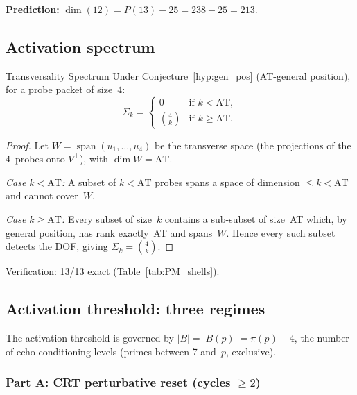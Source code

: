 \documentclass[12pt,a4paper]{article}
\begin{document}
\noindent
\textbf{Prediction:} $\dim(12) = P(13) - 25 = 238 - 25 = 213$.


\subsection{Activation spectrum}
\label{sec:PM_sigma}

\begin{thmbox}{Transversality Spectrum}
\label{thm:sigma}
Under Conjecture~\ref{hyp:gen_pos} (AT-general position), for a probe packet
of size~$4$:
\[
  \Sigma_k = \begin{cases}
    0 & \text{if } k < \mathrm{AT}, \\
    \displaystyle\binom{4}{k} & \text{if } k \ge \mathrm{AT}.
  \end{cases}
\]
\end{thmbox}

\begin{proof}
Let $W = \operatorname{span}(u_1, \ldots, u_4)$ be the transverse space (the
projections of the 4~probes onto $V^{\perp}$), with $\dim W = \mathrm{AT}$.

\emph{Case $k < \mathrm{AT}$:}  A subset of $k < \mathrm{AT}$ probes spans a
space of dimension $\le k < \mathrm{AT}$ and cannot cover~$W$.

\emph{Case $k \ge \mathrm{AT}$:}  Every subset of size~$k$ contains a
sub-subset of size~AT which, by general position, has rank exactly~AT and
spans~$W$.  Hence every such subset detects the DOF, giving
$\Sigma_k = \binom{4}{k}$.
\end{proof}

\noindent
Verification: 13/13 exact (Table~\ref{tab:PM_shells}).


\subsection{Activation threshold: three regimes}
\label{sec:PM_AT}

The activation threshold is governed by
$|B| = |B(p)| = \pi(p) - 4$,
the number of echo conditioning levels (primes between 7 and~$p$, exclusive).

\subsubsection{Part A: CRT perturbative reset (cycles $\ge 2$)}
\end{document}
